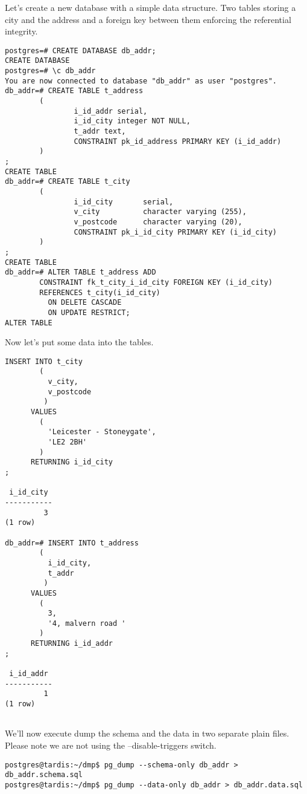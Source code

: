 Let's create a new database with a simple data structure. Two tables storing a city and the address
and a foreign key between them enforcing the referential integrity.

\begin{lstlisting}[style=pgsql]
postgres=# CREATE DATABASE db_addr;
CREATE DATABASE
postgres=# \c db_addr
You are now connected to database "db_addr" as user "postgres".
db_addr=# CREATE TABLE t_address
        (
                i_id_addr serial,
                i_id_city integer NOT NULL,
                t_addr text,
                CONSTRAINT pk_id_address PRIMARY KEY (i_id_addr)
        )
;
CREATE TABLE
db_addr=# CREATE TABLE t_city
        (
                i_id_city       serial,
                v_city          character varying (255),
                v_postcode      character varying (20),
                CONSTRAINT pk_i_id_city PRIMARY KEY (i_id_city)
        )
;
CREATE TABLE
db_addr=# ALTER TABLE t_address ADD
	    CONSTRAINT fk_t_city_i_id_city FOREIGN KEY (i_id_city)
	    REFERENCES t_city(i_id_city)
	      ON DELETE CASCADE
	      ON UPDATE RESTRICT;
ALTER TABLE

\end{lstlisting}

Now let's put some data into the tables.

\begin{lstlisting}[style=pgsql]
INSERT INTO t_city
	    (
	      v_city,	
	      v_postcode
	     )
      VALUES
	    (
	      'Leicester - Stoneygate',
	      'LE2 2BH'
	    )
      RETURNING i_id_city
;

 i_id_city
-----------
         3
(1 row)

db_addr=# INSERT INTO t_address
	    (
	      i_id_city,	
	      t_addr
	     )
      VALUES
	    (
	      3,
	      '4, malvern road '
	    )
      RETURNING i_id_addr
;

 i_id_addr
-----------
         1
(1 row)


\end{lstlisting}

We'll now execute dump the schema and the data in two separate plain files. Please note we are not using
the --disable-triggers switch.

\begin{verbatim}
postgres@tardis:~/dmp$ pg_dump --schema-only db_addr > db_addr.schema.sql
postgres@tardis:~/dmp$ pg_dump --data-only db_addr > db_addr.data.sql

\end{verbatim}

